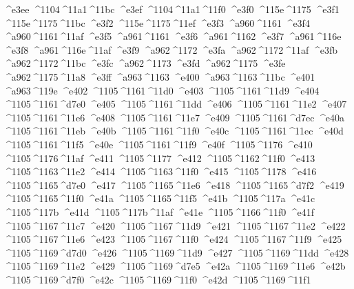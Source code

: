 \checkit ^^^^e3ee ^^^^1104^^^^11a1^^^^11bc
\checkit ^^^^e3ef ^^^^1104^^^^11a1^^^^11f0
\checkit ^^^^e3f0 ^^^^115e^^^^1175
\checkit ^^^^e3f1 ^^^^115e^^^^1175^^^^11bc
\checkit ^^^^e3f2 ^^^^115e^^^^1175^^^^11ef
\checkit ^^^^e3f3 ^^^^a960^^^^1161
\checkit ^^^^e3f4 ^^^^a960^^^^1161^^^^11af
\checkit ^^^^e3f5 ^^^^a961^^^^1161
\checkit ^^^^e3f6 ^^^^a961^^^^1162
\checkit ^^^^e3f7 ^^^^a961^^^^116e
\checkit ^^^^e3f8 ^^^^a961^^^^116e^^^^11af
\checkit ^^^^e3f9 ^^^^a962^^^^1172
\checkit ^^^^e3fa ^^^^a962^^^^1172^^^^11af
\checkit ^^^^e3fb ^^^^a962^^^^1172^^^^11bc
\checkit ^^^^e3fc ^^^^a962^^^^1173
\checkit ^^^^e3fd ^^^^a962^^^^1175
\checkit ^^^^e3fe ^^^^a962^^^^1175^^^^11a8
\checkit ^^^^e3ff ^^^^a963^^^^1163
\checkit ^^^^e400 ^^^^a963^^^^1163^^^^11bc
\checkit ^^^^e401 ^^^^a963^^^^119e
\checkit ^^^^e402 ^^^^1105^^^^1161^^^^11d0
\checkit ^^^^e403 ^^^^1105^^^^1161^^^^11d9
\checkit ^^^^e404 ^^^^1105^^^^1161^^^^d7e0
\checkit ^^^^e405 ^^^^1105^^^^1161^^^^11dd
\checkit ^^^^e406 ^^^^1105^^^^1161^^^^11e2
\checkit ^^^^e407 ^^^^1105^^^^1161^^^^11e6
\checkit ^^^^e408 ^^^^1105^^^^1161^^^^11e7
\checkit ^^^^e409 ^^^^1105^^^^1161^^^^d7ec
\checkit ^^^^e40a ^^^^1105^^^^1161^^^^11eb
\checkit ^^^^e40b ^^^^1105^^^^1161^^^^11f0
\checkit ^^^^e40c ^^^^1105^^^^1161^^^^11ec
\checkit ^^^^e40d ^^^^1105^^^^1161^^^^11f5
\checkit ^^^^e40e ^^^^1105^^^^1161^^^^11f9
\checkit ^^^^e40f ^^^^1105^^^^1176
\checkit ^^^^e410 ^^^^1105^^^^1176^^^^11af
\checkit ^^^^e411 ^^^^1105^^^^1177
\checkit ^^^^e412 ^^^^1105^^^^1162^^^^11f0
\checkit ^^^^e413 ^^^^1105^^^^1163^^^^11e2
\checkit ^^^^e414 ^^^^1105^^^^1163^^^^11f0
\checkit ^^^^e415 ^^^^1105^^^^1178
\checkit ^^^^e416 ^^^^1105^^^^1165^^^^d7e0
\checkit ^^^^e417 ^^^^1105^^^^1165^^^^11e6
\checkit ^^^^e418 ^^^^1105^^^^1165^^^^d7f2
\checkit ^^^^e419 ^^^^1105^^^^1165^^^^11f0
\checkit ^^^^e41a ^^^^1105^^^^1165^^^^11f5
\checkit ^^^^e41b ^^^^1105^^^^117a
\checkit ^^^^e41c ^^^^1105^^^^117b
\checkit ^^^^e41d ^^^^1105^^^^117b^^^^11af
\checkit ^^^^e41e ^^^^1105^^^^1166^^^^11f0
\checkit ^^^^e41f ^^^^1105^^^^1167^^^^11c7
\checkit ^^^^e420 ^^^^1105^^^^1167^^^^11d9
\checkit ^^^^e421 ^^^^1105^^^^1167^^^^11e2
\checkit ^^^^e422 ^^^^1105^^^^1167^^^^11e6
\checkit ^^^^e423 ^^^^1105^^^^1167^^^^11f0
\checkit ^^^^e424 ^^^^1105^^^^1167^^^^11f9
\checkit ^^^^e425 ^^^^1105^^^^1169^^^^d7d0
\checkit ^^^^e426 ^^^^1105^^^^1169^^^^11d9
\checkit ^^^^e427 ^^^^1105^^^^1169^^^^11dd
\checkit ^^^^e428 ^^^^1105^^^^1169^^^^11e2
\checkit ^^^^e429 ^^^^1105^^^^1169^^^^d7e5
\checkit ^^^^e42a ^^^^1105^^^^1169^^^^11e6
\checkit ^^^^e42b ^^^^1105^^^^1169^^^^d7f0
\checkit ^^^^e42c ^^^^1105^^^^1169^^^^11f0
\checkit ^^^^e42d ^^^^1105^^^^1169^^^^11f1
